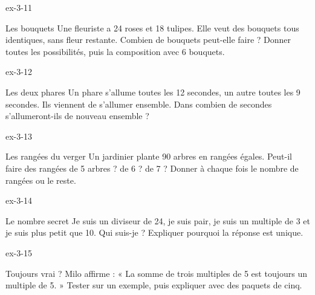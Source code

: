 \begin{blocLivre}{ex-3-11}\begin{exercice}[3]{Les bouquets}
Une fleuriste a 24 roses et 18 tulipes. Elle veut des bouquets tous identiques, sans fleur restante. Combien de bouquets peut-elle faire ? Donner toutes les possibilités, puis la composition avec 6 bouquets.
\end{exercice}\end{blocLivre}
\begin{blocLivre}{ex-3-12}\begin{exercice}[3]{Les deux phares}
Un phare s’allume toutes les 12 secondes, un autre toutes les 9 secondes. Ils viennent de s’allumer ensemble. Dans combien de secondes s’allumeront-ils de nouveau ensemble ?
\end{exercice}\end{blocLivre}
\begin{blocLivre}{ex-3-13}\begin{exercice}[3]{Les rangées du verger}
Un jardinier plante 90 arbres en rangées égales. Peut-il faire des rangées de 5 arbres ? de 6 ? de 7 ? Donner à chaque fois le nombre de rangées ou le reste.
\end{exercice}\end{blocLivre}
\begin{blocLivre}{ex-3-14}\begin{exercice}[3]{Le nombre secret}
Je suis un diviseur de 24, je suis pair, je suis un multiple de 3 et je suis plus petit que 10. Qui suis-je ? Expliquer pourquoi la réponse est unique.
\end{exercice}\end{blocLivre}
\begin{blocLivre}{ex-3-15}\begin{exercice}[3]{Toujours vrai ?}
Milo affirme : « La somme de trois multiples de 5 est toujours un multiple de 5. » Tester sur un exemple, puis expliquer avec des paquets de cinq.
\end{exercice}\end{blocLivre}

\clearpage
